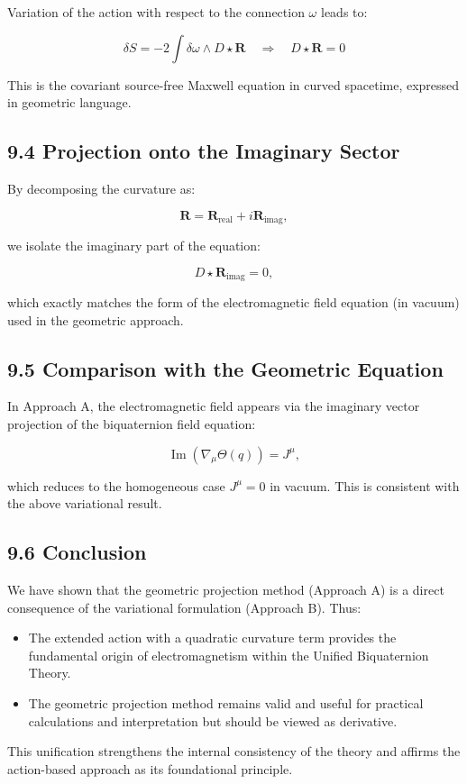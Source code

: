 Variation of the action with respect to the connection \( \omega \) leads to:

\[
\delta S = -2 \int \delta \omega \wedge D \star \mathbf{R} \quad \Rightarrow \quad D \star \mathbf{R} = 0
\]

This is the covariant source-free Maxwell equation in curved spacetime, expressed in geometric language.

\subsection*{9.4 Projection onto the Imaginary Sector}

By decomposing the curvature as:

\[
\mathbf{R} = \mathbf{R}_{\text{real}} + i \mathbf{R}_{\text{imag}},
\]

we isolate the imaginary part of the equation:

\[
D \star \mathbf{R}_{\text{imag}} = 0,
\]

which exactly matches the form of the electromagnetic field equation (in vacuum) used in the geometric approach.

\subsection*{9.5 Comparison with the Geometric Equation}

In Approach A, the electromagnetic field appears via the imaginary vector projection of the biquaternion field equation:

\[
\operatorname{Im}(\nabla_\mu \Theta(q)) = J^\mu,
\]

which reduces to the homogeneous case \( J^\mu = 0 \) in vacuum. This is consistent with the above variational result.

\subsection*{9.6 Conclusion}

We have shown that the geometric projection method (Approach A) is a direct consequence of the variational formulation (Approach B). Thus:

\begin{itemize}
  \item The extended action with a quadratic curvature term provides the fundamental origin of electromagnetism within the Unified Biquaternion Theory.
  \item The geometric projection method remains valid and useful for practical calculations and interpretation but should be viewed as derivative.
\end{itemize}

This unification strengthens the internal consistency of the theory and affirms the action-based approach as its foundational principle.
